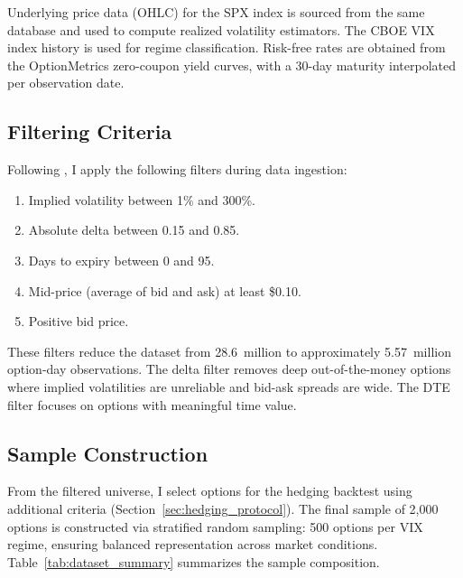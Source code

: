 \documentclass[12pt, letterpaper]{article}
\begin{document}
Underlying price data (OHLC) for the SPX index is sourced from the same database and used to compute realized volatility estimators. The CBOE VIX index history is used for regime classification. Risk-free rates are obtained from the OptionMetrics zero-coupon yield curves, with a 30-day maturity interpolated per observation date.

\subsection{Filtering Criteria}

Following \citet{Hull2017}, I apply the following filters during data ingestion:

\begin{enumerate}
    \item Implied volatility between 1\% and 300\%.
    \item Absolute delta between 0.15 and 0.85.
    \item Days to expiry between 0 and 95.
    \item Mid-price (average of bid and ask) at least \$0.10.
    \item Positive bid price.
\end{enumerate}

These filters reduce the dataset from 28.6~million to approximately 5.57~million option-day observations. The delta filter removes deep out-of-the-money options where implied volatilities are unreliable and bid-ask spreads are wide. The DTE filter focuses on options with meaningful time value.

\subsection{Sample Construction}

From the filtered universe, I select options for the hedging backtest using additional criteria (Section~\ref{sec:hedging_protocol}). The final sample of 2,000 options is constructed via stratified random sampling: 500 options per VIX regime, ensuring balanced representation across market conditions. Table~\ref{tab:dataset_summary} summarizes the sample composition.
\end{document}
